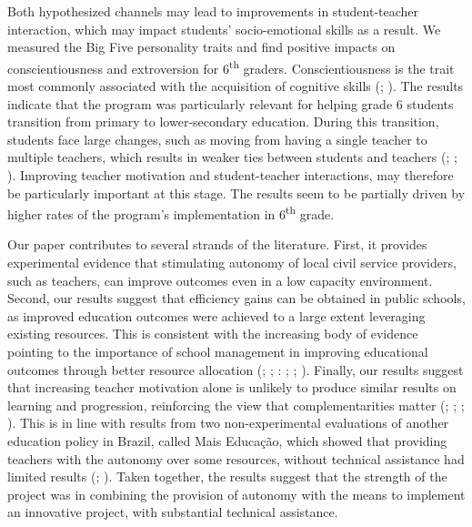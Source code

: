 \documentclass[11pt,a4paper]{article}
\begin{document}
Both hypothesized channels may lead to improvements in student-teacher interaction, which may impact students' socio-emotional skills as a result. We measured the Big Five personality traits and find positive impacts on conscientiousness and extroversion for 6\textsuperscript{th} graders. Conscientiousness is the trait most commonly associated with the acquisition of cognitive skills (\citealp{poropat2009meta}; \citealp{ivcevic2014predicting}). The results indicate that the program was particularly relevant for helping grade 6 students transition from primary to lower-secondary education. During this transition, students face large changes, such as moving from having a single teacher to multiple teachers, which results in weaker ties between students and teachers (\citealp{bedard2005middle}; \citealp{hanewald2013transition}; \citealp{dos2017mais}). Improving teacher motivation and student-teacher interactions, may therefore be particularly important at this stage. The results seem to be partially driven by higher rates of the program's implementation in 6\textsuperscript{th} grade.


Our paper contributes to several strands of the literature. First, it provides experimental evidence that stimulating autonomy of local civil service providers, such as teachers, can improve outcomes even in a low capacity environment. Second, our results suggest that efficiency gains can be obtained in public schools, as improved education outcomes were achieved to a large extent leveraging existing resources. This is consistent with the increasing body of evidence pointing to the importance of school management in improving educational outcomes through better resource allocation (\citealp{abdulkadirouglu2011accountability}; \citealp{dobbie2013getting}; \citealp{rockoff2012information}: \citealp{taylor2012effect}; \citealp{fryer2014injecting}; \citealp{fryer2017management}). Finally, our results suggest that increasing teacher motivation alone is unlikely to produce similar results on learning and progression, reinforcing the view that complementarities matter (\citealp{WDR2018}; \citealp{gilligan2018educator}; \citealp{andrew2019preschool}; \citealp{mbiti2019inputs}). This is in line with results from two non-experimental evaluations of another education policy in Brazil, called  Mais Educação, which showed that providing teachers with the autonomy over some resources, without technical assistance had limited results (\citealp{almeida2016assessing}; \citealp{de2016impacto}). Taken together, the results suggest that the strength of the project was in combining the provision of autonomy with the means to implement an innovative project, with substantial technical assistance.  
\end{document}
